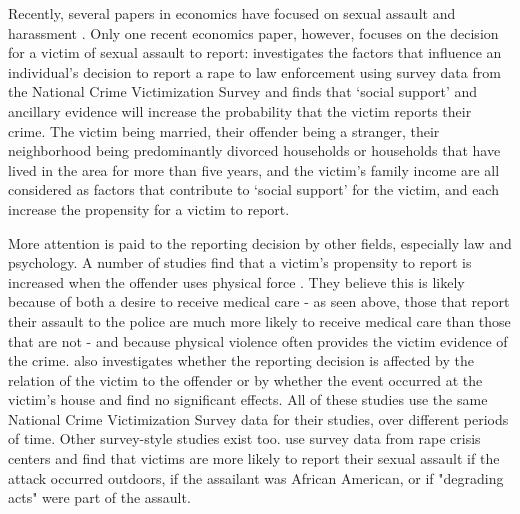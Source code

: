 \documentclass[AER,draftmode]{AEA}
\begin{document}
Recently, several papers in economics have focused on sexual assault and harassment \cite{lindo_college_2018,bisschop_street_2017,borker_safety_2018}. Only one recent economics paper, however, focuses on the decision for a victim of sexual assault to report:  investigates the factors that influence an individual's decision to report a rape to law enforcement using survey data from the National Crime Victimization Survey and finds that `social support' and ancillary evidence will increase the probability that the victim reports their crime. The victim being married, their offender being a stranger, their neighborhood being predominantly divorced households or households that have lived in the area for more than five years, and the victim's family income are all considered as factors that contribute to `social support' for the victim, and each increase the propensity for a victim to report.

More attention is paid to the reporting decision by other fields, especially law and psychology. A number of studies find that a victim's propensity to report is increased when the offender uses physical force \cite{bachman_predicting_1993,du_mont_role_2003}. They believe this is likely because of both a desire to receive medical care - as seen above, those that report their assault to the police are much more likely to receive medical care than those that are not - and because physical violence often provides the victim evidence of the crime.  also investigates whether the reporting decision is affected by the relation of the victim to the offender or by whether the event occurred at the victim's house and find no significant effects. All of these studies use the same National Crime Victimization Survey data for their studies, over different periods of time. Other survey-style studies exist too.  use survey data from rape crisis centers and find that victims are more likely to report their sexual assault if the attack occurred outdoors, if the assailant was African American, or if "degrading acts" were part of the assault. 
\end{document}
